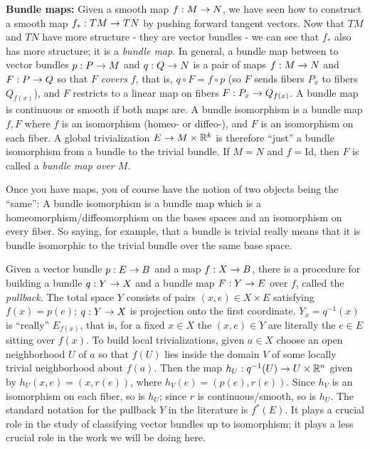 \msk

{\bf Bundle maps:} Given a smooth map $f:M\rightarrow N$, we have seen how to construct a smooth
map $f_*:TM\rightarrow TN$ by pushing forward tangent vectors. Now that $TM$ and $TN$ have
more structure - they are vector bundles - we can see that $f_*$ also has more
structure; it is a {\it bundle map}. In general, a bundle map between to vector bundles
$p:P\rightarrow M$ and $q:Q\rightarrow N$ is a pair of maps $f:M\rightarrow N$ and $F:P\rightarrow Q$ so that 
$F$ {\it covers} $f$, that is, $q\circ F = f\circ p$ (so $F$ sends
fibers $P_x$ to fibers $Q_{f(x)}$), and $F$ restricts to a linear
map on fibers $F:P_x\rightarrow Q_{f(x)}$. A bundle map is continuous or smooth if both maps are.
A bundle isomorphism is a bundle map $f,F$ where $f$ is an isomorphism (homeo- or diffeo-),
and $F$ is an isomorphism on each fiber. A global trivialization $E\rightarrow M\times {\Bbb R}^k$
is therefore ``just'' a bundle isomorphism from a bundle to the trivial bundle.
If $M=N$ and $f=$Id, then $F$ is called a {\it bundle map over $M$}.

Once you have maps, you of course have the notion of two objects being the ``same'':
A bundle isomorphism is a bundle map which is a homeomorphism/diffeomorphism
on the bases spaces and an isomorphism on every fiber. So saying, for example, that
a bundle is trivial really means that it is bundle isomorphic to the trivial 
bundle over the same base space. 

Given a vector bundle $p:E\rightarrow B$ and a map $f:X\rightarrow B$, there is a procedure for building a 
bundle $q:Y\rightarrow X$ and a bundle map $F:Y\rightarrow E$ over $f$, called the {\it pullback}.
The total space $Y$ consists of pairs $(x,e)\in X\times E$ satisfying $f(x)=p(e)$;
$q:Y\rightarrow X$ is projection onto the first coordinate. $Y_x=q^{-1}(x)$ is ``really''
$E_{f(x)}$, that is, for a fixed $x\in X$ the $(x,e)\in Y$ are literally the $e\in E$
sitting over $f(x)$. To build local trivializations, 
given $a\in X$ choose an open neighborhood $U$ of $a$ so that $f(U)$ lies inside
the domain $V$ of some locally trivial neighborhood about $f(a)$. Then the 
map $h_U:q^{-1}(U)\rightarrow U\times {\Bbb R}^n$ given by $h_U(x,e)=(x,r(e))$, where
$h_V(e)=(p(e),r(e))$. Since $h_V$ is an isomorphism on each fiber, so is 
$h_U$; since $r$ is continuous/smooth, so is $h_U$. The standard notation for the 
pullback $Y$ in the literature is $f^*(E)$. It plays a crucial role in the study
of classifying vector bundles up to isomorphism; it plays a less crucial role in 
the work we will be doing here.

\msk

